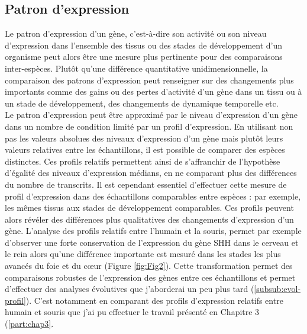 \subsection{Patron d’expression}
\label{subsec:Patron-expression}

Le patron d’expression d’un gène, c’est-à-dire son activité ou son niveau d’expression dans l’ensemble des tissus ou des stades de développement d’un organisme peut alors être une mesure plus pertinente pour des comparaisons inter-espèces. Plutôt qu’une différence quantitative unidimensionnelle, la comparaison des patrons d’expression peut renseigner sur des changements plus importants comme des gains ou des pertes d’activité d’un gène dans un tissu ou à un stade de développement, des changements de dynamique temporelle etc.  \\

Le patron d’expression peut être approximé par le niveau d’expression d’un gène dans un nombre de \gls{condition} limité par un profil d’expression. En utilisant non pas les valeurs absolues des niveaux d’expression d’un gène mais plutôt leurs valeurs relatives entre les échantillons, il est possible de comparer des espèces distinctes. Ces profils relatifs permettent ainsi de s’affranchir de l’hypothèse d’égalité des niveaux d’expression médians, en ne comparant plus des différences du nombre de transcrits. Il est cependant essentiel d’effectuer cette mesure de profil d’expression dans des échantillons comparables entre espèces : par exemple, les mêmes tissus aux stades de développement comparables. Ces profils peuvent alors révéler des différences plus qualitatives des changements d’expression d’un gène. L’analyse des profils relatifs entre l’humain et la souris, permet par exemple d’observer une forte conservation de l’expression du gène \acrshort{SHH} dans le cerveau et le rein alors qu’une différence importante est mesuré dans les stades les plus avancés du foie et du cœur (Figure \ref{fig:Fig2}). Cette transformation permet des comparaisons robustes de l’expression des gènes entre ces échantillons et permet d’effectuer des analyses évolutives que j’aborderai un peu plus tard (\ref{subsub:evol-profil}). C’est notamment en comparant des profils d’expression relatifs entre humain et souris que j’ai pu effectuer le travail présenté en Chapitre 3 (\ref{part:chap3}. \\

